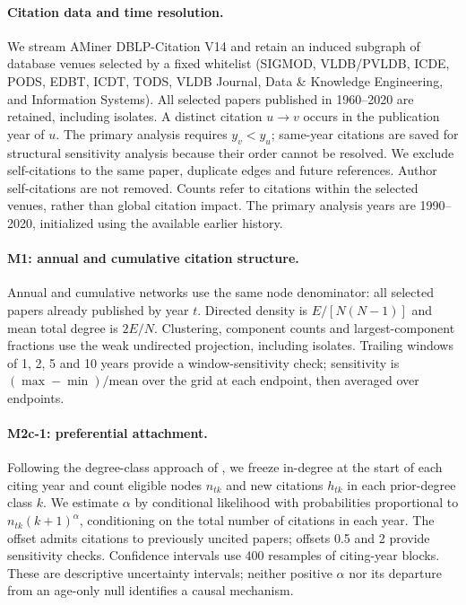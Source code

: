 \paragraph{Citation data and time resolution.}
We stream AMiner DBLP-Citation V14 \citep{tang2008arnetminer} and retain an induced subgraph of database
venues selected by a fixed whitelist (SIGMOD, VLDB/PVLDB, ICDE, PODS, EDBT,
ICDT, TODS, VLDB Journal, Data \& Knowledge Engineering, and Information Systems).
All selected papers published in 1960--2020 are retained, including isolates.
A distinct citation $u\to v$ occurs in the publication year of $u$.
The primary analysis requires $y_v<y_u$; same-year citations are saved for
structural sensitivity analysis because their order cannot be resolved.
We exclude self-citations to the same paper, duplicate edges and future references.
Author self-citations are not removed. Counts refer to citations within the
selected venues, rather than global citation impact. The primary analysis years
are 1990--2020, initialized using the available earlier history.

\paragraph{M1: annual and cumulative citation structure.}
Annual and cumulative networks use the same node denominator: all selected
papers already published by year $t$. Directed density is $E/[N(N-1)]$ and
mean total degree is $2E/N$. Clustering, component counts and largest-component
fractions use the weak undirected projection, including isolates.
Trailing windows of 1, 2, 5 and 10 years provide a window-sensitivity check;
sensitivity is $(\max-\min)/\mathrm{mean}$ over the grid at each endpoint,
then averaged over endpoints.

\paragraph{M2c-1: preferential attachment.}
Following the degree-class approach of \citet{jeong2003measuring}, we freeze
in-degree at the start of each citing year and count eligible nodes $n_{tk}$ and
new citations $h_{tk}$ in each prior-degree class $k$.
We estimate $\alpha$ by conditional likelihood with probabilities proportional
to $n_{tk}(k+1)^\alpha$, conditioning on the total number of citations in each year.
The offset admits citations to previously uncited papers; offsets 0.5 and 2
provide sensitivity checks. Confidence intervals use 400 resamples of citing-year
blocks. These are descriptive uncertainty intervals; neither positive $\alpha$
nor its departure from an age-only null identifies a causal mechanism.

